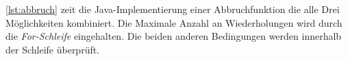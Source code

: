 \autoref{lst:abbruch} zeit die Java-Implementierung einer Abbruchfunktion die alle Drei Möglichkeiten
kombiniert. Die Maximale Anzahl an Wiederholungen wird durch die \textit{For-Schleife} eingehalten.
Die beiden anderen Bedingungen werden innerhalb der Schleife überprüft.
